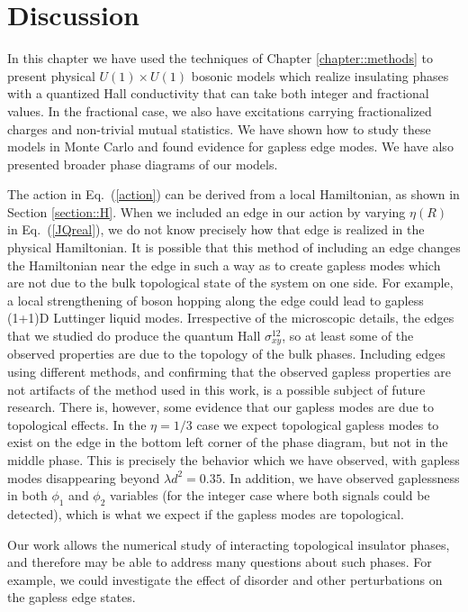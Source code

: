 \section{Discussion}
In this chapter we have used the techniques of Chapter \ref{chapter::methods} to present physical $U(1) \times U(1)$ bosonic models which realize insulating phases with a quantized Hall conductivity that can take both integer and fractional values. 
In the fractional case, we also have excitations carrying fractionalized charges and non-trivial mutual statistics. We have shown how to study these models in Monte Carlo and found evidence for gapless edge modes. We have also presented broader phase diagrams of our models.

The action in Eq.~(\ref{action}) can be derived from a local Hamiltonian, as shown in Section \ref{section::H}. When we included an edge in our action by varying $\eta(R)$ in Eq.~(\ref{JQreal}), we do not know precisely how that edge is realized in the physical Hamiltonian. It is possible that this method of including an edge changes the Hamiltonian near the edge in such a way as to create gapless modes which are not due to the bulk topological state of the system on one side.  For example, a local strengthening of boson hopping along the edge could lead to gapless (1+1)D Luttinger liquid modes.  Irrespective of the microscopic details, the edges that we studied do produce the quantum Hall $\sigma^{12}_{xy}$, so at least some of the observed properties are due to the topology of the bulk phases.  Including edges using different methods, and confirming that the observed gapless properties are not artifacts of the method used in this work, is a possible subject of future research. There is, however, some evidence that our gapless modes are due to topological effects. In the $\eta=1/3$ case we expect topological gapless modes to exist on the edge in the bottom left corner of the phase diagram, but not in the middle phase. This is precisely the behavior which we have observed, with gapless modes disappearing beyond $\lambda d^2=0.35$. In addition, we have observed gaplessness in both $\phi_1$ and $\phi_2$ variables (for the integer case where both signals could be detected), which is what we expect if the gapless modes are topological.

Our work allows the numerical study of interacting topological insulator phases, and therefore may be able to address many questions about such phases. For example, we could investigate the effect of disorder and other perturbations on the gapless edge states. 

